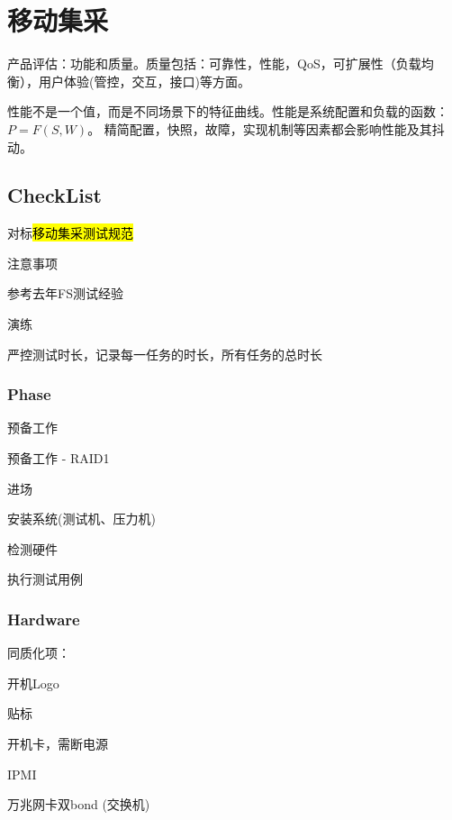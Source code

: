 \chapter{移动集采}

产品评估：功能和质量。质量包括：可靠性，性能，QoS，可扩展性（负载均衡），用户体验(管控，交互，接口)等方面。

性能不是一个值，而是不同场景下的特征曲线。性能是系统配置和负载的函数：$P=F(S, W)$。
精简配置，快照，故障，实现机制等因素都会影响性能及其抖动。

\section{CheckList}

对标\hl{移动集采测试规范}

注意事项
\begin{enumbox}
\item 参考去年FS测试经验
\item 演练
\item 严控测试时长，记录每一任务的时长，所有任务的总时长
\end{enumbox}

\subsection{Phase}

\begin{enumbox}
\item 预备工作
\item 预备工作 - RAID1
\item 进场
\item 安装系统(测试机、压力机)
\item 检测硬件
\item 执行测试用例
\end{enumbox}

\subsection{Hardware}

同质化项：
\begin{enumbox}
\item 开机Logo
\item 贴标
\item 开机卡，需断电源
\item IPMI
\item 万兆网卡双bond (交换机)
\end{enumbox}


